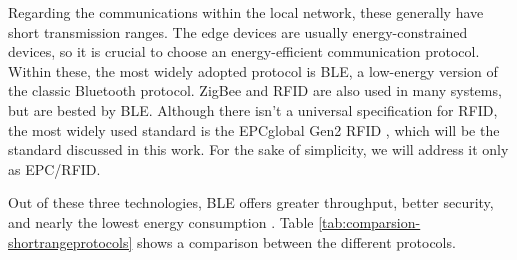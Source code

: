 

Regarding the communications within the local network, these generally have short transmission ranges. The edge devices are usually energy-constrained devices, so it is crucial to choose an energy-efficient communication protocol. Within these, the most widely adopted protocol is \acf{BLE}, a low-energy version of the classic Bluetooth protocol.  ZigBee and \acf{RFID} are also used in many systems, but are bested by \acs{BLE}. Although there isn't a universal specification for \acs{RFID}, the most widely used standard is the EPCglobal Gen2 RFID \cite{EPCglobal2006}, which will be the standard discussed in this work. For the sake of simplicity, we will address it only as EPC/\acs{RFID}. \bigskip

Out of these three technologies, \acs{BLE} offers greater throughput, better security, and nearly the lowest energy consumption \cite{dementyev2013power}. Table \ref{tab:comparsion-shortrangeprotocols} shows a comparison between the different protocols.

